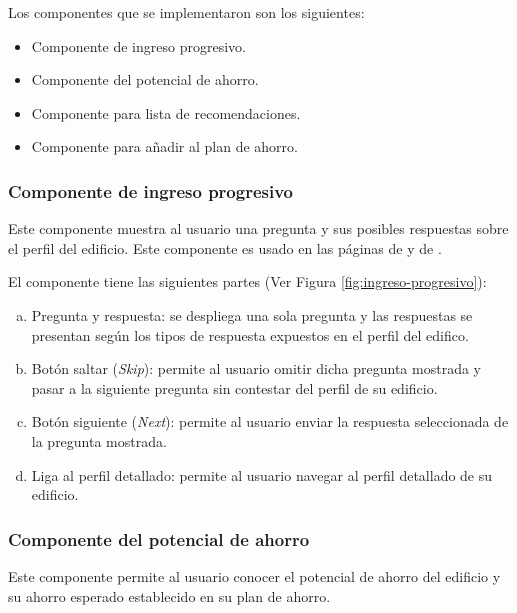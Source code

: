 Los componentes que se implementaron son los siguientes:
\begin{itemize}
\item Componente de ingreso progresivo.
\item Componente del potencial de ahorro.
\item Componente para lista de recomendaciones.
\item Componente para añadir al plan de ahorro.
\end{itemize}


\subsubsection{Componente de ingreso progresivo}

Este componente muestra al usuario una pregunta y sus posibles respuestas sobre el
perfil del edificio. Este componente es usado en las páginas de
 y de .

El componente tiene las siguientes partes (Ver Figura \ref{fig:ingreso-progresivo}):
\begin{enumerate}[a)]
\item Pregunta y respuesta: se despliega una sola pregunta y
  las respuestas se presentan según los tipos de respuesta expuestos
  en el perfil del edifico.
\item Botón saltar (\textit{Skip}): permite al usuario omitir dicha pregunta
  mostrada y pasar a la siguiente pregunta sin contestar del perfil
  de su edificio.
\item Botón siguiente (\textit{Next}): permite al usuario enviar la respuesta
  seleccionada de la pregunta mostrada.
\item Liga al perfil detallado: permite al usuario navegar al perfil
  detallado de su edificio.
\end{enumerate}

\subsubsection{Componente del potencial de ahorro}

Este componente permite al usuario conocer el potencial de ahorro del edificio y su
ahorro esperado establecido en su plan de ahorro.

